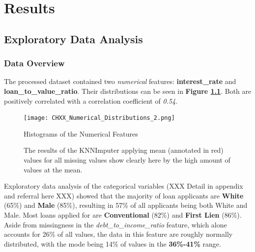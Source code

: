 \chapter{Results}\label{chap:Results}

\section{Exploratory Data Analysis}\label{sec:Exploratory_Data_Analysis}

\subsection{Data Overview}\label{subsec:Data_Overview}

The processed dataset contained two \textit{numerical} features: \textbf{interest\_rate} and \textbf{loan\_to\_value\_ratio}.
Their distributions can be seen in \textbf{Figure \ref{fig:CHXX_Numerical_Distributions_2}}.
Both are positively correlated with a correlation coefficient of \textit{0.54}. 


\begin{figure}[h]
    \centering
    \texttt{[image: CHXX\_Numerical\_Distributions\_2.png]}
    \caption{Histograms of the Numerical Features}
    \caption*{The results of the KNNImputer applying mean (annotated in red) values for all missing values show clearly here by the high amount of values at the mean.}
    \label{fig:CHXX_Numerical_Distributions_2}
\end{figure}

Exploratory data analysis of the categorical variables (XXX Detail in appendix and referral here XXX) showed that the majority of loan applicants are \textbf{White} (65\%) and \textbf{Male} (85\%), resulting in 57\% of all applicants being both White and Male.
Most loans applied for are \textbf{Conventional} (82\%) and \textbf{First Lien} (86\%).
Aside from missingness in the \textit{debt\_to\_income\_ratio} feature, which alone accounts for 26\% of all values, the data in this feature are roughly normally distributed, with the mode being 14\% of values in the \textbf{36\%-41\%} range. 

